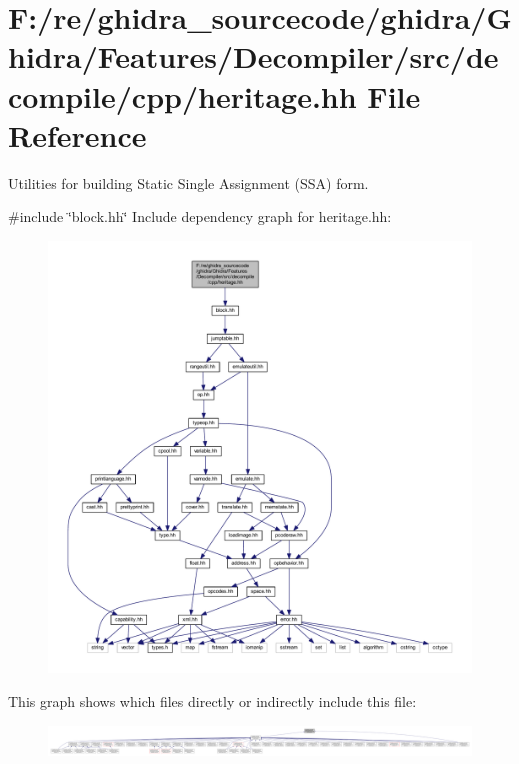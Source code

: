 \hypertarget{heritage_8hh}{}\section{F\+:/re/ghidra\+\_\+sourcecode/ghidra/\+Ghidra/\+Features/\+Decompiler/src/decompile/cpp/heritage.hh File Reference}
\label{heritage_8hh}


Utilities for building Static Single Assignment (S\+SA) form.  


{\ttfamily \#include \char`\"{}block.\+hh\char`\"{}}\newline
Include dependency graph for heritage.\+hh\+:
\nopagebreak
\begin{figure}[H]
\begin{center}
\leavevmode
\includegraphics[width=350pt]{heritage_8hh__incl}
\end{center}
\end{figure}
This graph shows which files directly or indirectly include this file\+:
\nopagebreak
\begin{figure}[H]
\begin{center}
\leavevmode
\includegraphics[width=350pt]{heritage_8hh__dep__incl}
\end{center}
\end{figure}
